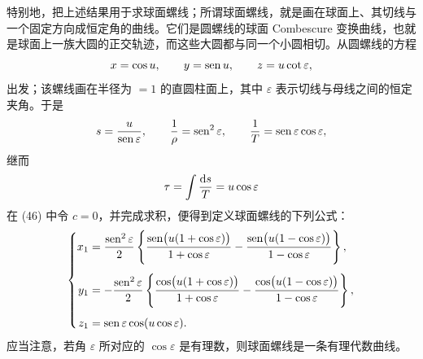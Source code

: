 特别地，把上述结果用于求球面螺线；所谓球面螺线，就是画在球面上、其切线与一个固定方向成恒定角的曲线。它们是圆螺线的球面 Combescure 变换曲线，也就是球面上一族大圆的正交轨迹，而这些大圆都与同一个小圆相切。从圆螺线的方程
\[
x=\cos u,
\qquad y=\operatorname{sen} u,
\qquad z=u\cot\varepsilon,
\]
出发；该螺线画在半径为 \(=1\) 的直圆柱面上，其中 \(\varepsilon\) 表示切线与母线之间的恒定夹角。于是
\[
s=\frac{u}{\operatorname{sen}\varepsilon},
\qquad
\frac{1}{\rho}=\operatorname{sen}^2\varepsilon,
\qquad
\frac{1}{T}=\operatorname{sen}\varepsilon\cos\varepsilon,
\]
继而
\[
\tau=\int\frac{\mathrm{d} s}{T}=u\cos\varepsilon
\]
在 (46) 中令 \(c=0\)，并完成求积，便得到定义球面螺线的下列公式：
\[
\left\{
\begin{aligned}
x_1&=\frac{\operatorname{sen}^2\varepsilon}{2}\left\{\frac{\operatorname{sen}\bigl(u(1+\cos\varepsilon)\bigr)}{1+\cos\varepsilon}
       -\frac{\operatorname{sen}\bigl(u(1-\cos\varepsilon)\bigr)}{1-\cos\varepsilon}\right\},\\[0.4em]
y_1&=-\frac{\operatorname{sen}^2\varepsilon}{2}\left\{\frac{\cos\bigl(u(1+\cos\varepsilon)\bigr)}{1+\cos\varepsilon}
       -\frac{\cos\bigl(u(1-\cos\varepsilon)\bigr)}{1-\cos\varepsilon}\right\},\\[0.4em]
z_1&=\operatorname{sen}\varepsilon\cos(u\cos\varepsilon).
\end{aligned}\right.
\]
应当注意，若角 \(\varepsilon\) 所对应的 \(\cos\varepsilon\) 是有理数，则球面螺线是一条有理代数曲线。
